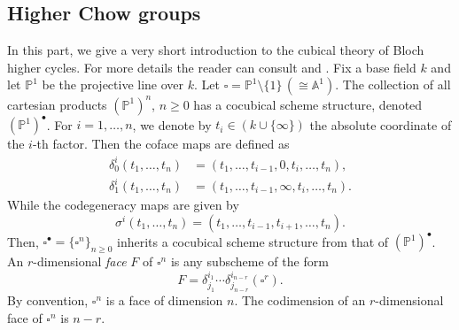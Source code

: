 \documentclass[11pt,a4paper]{amsart}
\newcommand{\A}{\mathds{A}}
\renewcommand{\P}{\mathds{P}}
\numberwithin{equation}{section}
\theoremstyle{plain}
\theoremstyle{definition}
\begin{document}
\subsection{Higher Chow groups}\label{subsec:2.2}
In this part, we give a very short introduction to the cubical theory
of Bloch higher cycles. For 
more details the reader can consult \cite{Levine:BhCgr} and \cite[\S
1.7, 1.8]{BGGP:Height}.  
Fix a base field $k$ and let $\P^1$ be the projective line over
$k$. Let $ \square = \P^1\setminus \{1\}\,(\cong \A^1).$
The collection of all cartesian
products $(\P^1)^{n}$, $n\ge 0$ has a cocubical scheme structure,
denoted $(\P^1)^{\bullet}$.
For $i=1,\dots,n$, we denote by $t_{i}\in (k\cup\{\infty\})$  the
absolute coordinate of the $i$-th factor. Then the 
coface maps
are defined as
\begin{align*}
  \delta_0^i(t_1,\dots,t_n) &= (t_1,\dots,t_{i-1},0,t_{i},\dots,t_n), \\
\delta_1^i(t_1,\dots,t_n) &= (t_1,\dots,t_{i-1},\infty,t_{i},\dots,t_n).
\end{align*}
While the codegeneracy maps are given by
\begin{displaymath}
  \sigma ^{i}(t_1,\dots,t_n)=(t_1,\dots,t_{i-1},t_{i+1},\dots,t_n).
\end{displaymath}
Then, $\square^{\bullet}=\{\square^{n}\}_{n\ge 0}$ inherits a cocubical scheme structure from
that of $(\P^1)^{\bullet}$.
An $r$-dimensional \emph{face} $F$ of $\square^n$ is any subscheme of the form
\begin{displaymath}
  F=\delta^{i_1}_{j_1}\cdots
  \delta^{i_{n-r}}_{j_{n-r}}(\square^{r}).
\end{displaymath}
By convention, $\square^n$ is a
face of dimension $n$. The codimension of an $r$-dimensional face of
$\square ^{n}$ is $n-r$.  
\end{document}
